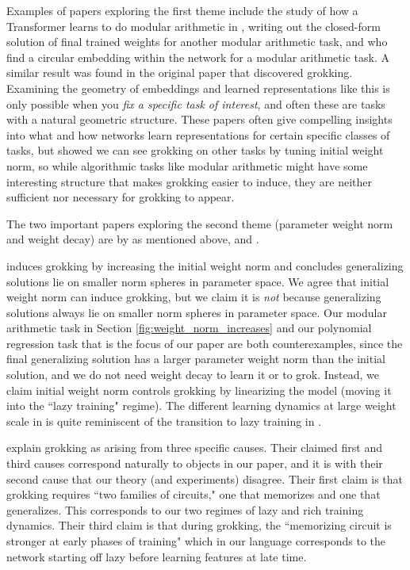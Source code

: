 \documentclass{article} %
\begin{document}
Examples of papers exploring the first theme include the study of how a Transformer learns to do modular arithmetic in \cite{nanda2023progress}, \cite{gromov2023grokking} writing out the closed-form solution of final trained weights for another modular arithmetic task, and \cite{liu2022towards} who find a circular embedding within the network for a modular arithmetic task. A similar result was found in the original \cite{power2022grokking} paper that discovered grokking. Examining the geometry of embeddings and learned representations like this is only possible when you \textit{fix a specific task of interest}, and often these are tasks with a natural geometric structure. These papers often give compelling insights into what and how networks learn representations for certain specific classes of tasks, but \cite{liu2022omnigrok} showed we can see grokking on other tasks by tuning initial weight norm, so while algorithmic tasks like modular arithmetic might have some interesting structure that makes grokking easier to induce, they are neither sufficient nor necessary for grokking to appear. 

The two important papers exploring the second theme (parameter weight norm and weight decay) are by \cite{liu2022omnigrok} as mentioned above, and \cite{varma2023explaining}. 

\cite{liu2022omnigrok} induces grokking by increasing the initial weight norm and concludes generalizing solutions lie on smaller norm spheres in parameter space. We agree that initial weight norm can induce grokking, but we claim it is \textit{not} because generalizing solutions always lie on smaller norm spheres in parameter space. Our modular arithmetic task in Section \ref{fig:weight_norm_increases} and our polynomial regression task that is the focus of our paper are both counterexamples, since the final generalizing solution has a larger parameter weight norm than the initial solution, and we do not need weight decay to learn it or to grok. Instead, we claim initial weight norm controls grokking by linearizing the model (moving it into the ``lazy training" regime). The different learning dynamics at large weight scale in \cite{liu2022omnigrok} is quite reminiscent of the transition to lazy training in \cite{chizat2019lazy}.

\cite{varma2023explaining} explain grokking as arising from three specific causes. Their claimed first and third causes correspond naturally to objects in our paper, and it is with their second cause that our theory (and experiments) disagree. Their first claim is that grokking requires ``two families of circuits," one that memorizes and one that generalizes. This corresponds to our two regimes of lazy and rich training dynamics. Their third claim is that during grokking, the ``memorizing circuit is stronger at early phases of training" which in our language corresponds to the network starting off lazy before learning features at late time. 
\end{document}
